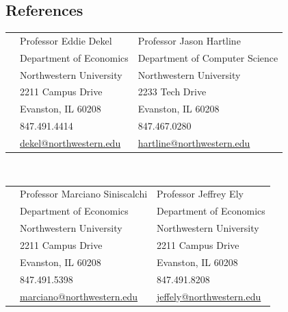 \documentclass[margin,line]{res}
\begin{document}
\begin{resume}
\section{ References}
\vspace{.05in}
\begin{tabular}{@{}p{0.20in}p{2.75in}p{2.75in}}
 & Professor Eddie Dekel           & Professor Jason Hartline \\
 & Department of Economics   & Department of Computer Science \\
 & Northwestern University   & Northwestern University \\
 & 2211 Campus Drive  & 2233 Tech Drive  \\
 & Evanston, IL 60208  & Evanston, IL 60208\\
 & 847.491.4414  & 847.467.0280\\
 &  \href{mailto: dekel@northwestern.edu}{dekel@northwestern.edu} &  \href{mailto: hartline@northwestern.edu}{hartline@northwestern.edu} \\
\end{tabular}
\vspace{.1in} ~\\
\begin{tabular}{@{}p{0.20in}p{2.75in}p{2.75in}}
	& Professor Marciano Siniscalchi           & Professor Jeffrey Ely \\
	& Department of Economics   & Department of Economics \\
	& Northwestern University   & Northwestern University \\
	& 2211 Campus Drive  & 2211 Campus Drive  \\
	& Evanston, IL 60208  & Evanston, IL 60208\\
	& 847.491.5398  & 847.491.8208\\
	&  \href{mailto: marciano@northwestern.edu}{marciano@northwestern.edu} &  \href{mailto: jeffely@northwestern.edu}{jeffely@northwestern.edu} \\
\end{tabular}



\end{resume}
\end{document}

